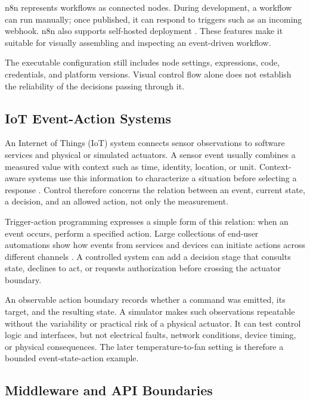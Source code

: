 n8n represents workflows as connected nodes. During development, a workflow can
run manually; once published, it can respond to triggers such as an incoming
webhook. n8n also supports self-hosted deployment
\cite{n8nCreateRunWorkflows,n8nHosting}. These features make it suitable for
visually assembling and inspecting an event-driven workflow.

The executable configuration still includes node settings, expressions, code,
credentials, and platform versions. Visual control flow alone does not establish
the reliability of the decisions passing through it.

\subsection{IoT Event-Action Systems}\label{subsec:theory-iot}

An Internet of Things (IoT) system connects sensor observations to software
services and physical or simulated actuators. A sensor event usually combines a
measured value with context such as time, identity, location, or unit.
Context-aware systems use this information to characterize a situation before
selecting a response \cite{perera2014context}. Control therefore concerns the
relation between an event, current state, a decision, and an allowed action, not
only the measurement.

Trigger-action programming expresses a simple form of this relation: when an
event occurs, perform a specified action. Large collections of end-user
automations show how events from services and devices can initiate actions across
different channels \cite{ur2016triggeraction}. A controlled system can add a
decision stage that consults state, declines to act, or requests authorization
before crossing the actuator boundary.

An observable action boundary records whether a command was emitted, its target,
and the resulting state. A simulator makes such observations repeatable without
the variability or practical risk of a physical actuator. It can test control
logic and interfaces, but not electrical faults, network conditions, device
timing, or physical consequences. The later temperature-to-fan setting is
therefore a bounded event-state-action example.

\subsection{Middleware and API Boundaries}\label{subsec:theory-middleware}

